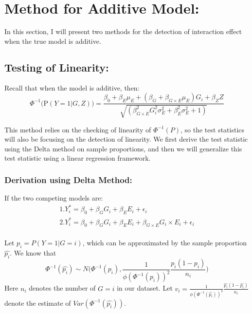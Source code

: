 \documentclass[
]{article}
\begin{document}
\hypertarget{method-for-additive-model}{%
\section{Method for Additive Model:}\label{method-for-additive-model}}

In this section, I will present two methods for the detection of
interaction effect when the true model is additive.

\hypertarget{testing-of-linearity}{%
\subsection{Testing of Linearity:}\label{testing-of-linearity}}

Recall that when the model is additive, then:
\[\Phi^{-1} \bigg(\text{P}(Y = 1 | G, Z) \bigg) = \frac{\beta_0+\beta_E \mu_E+(\beta_G + \beta_{G\times E} \mu_E)G_i + \beta_Z Z}{\sqrt{(\beta_{G\times E}^2 G_i^2 \sigma_E^2 + \beta_E^2 \sigma_E^2 + 1)}} \]

This method relies on the checking of linearity of \(\Phi^{-1}(P)\), so
the test statistics will also be focusing on the detection of linearity.
We first derive the test statistic using the Delta method on sample
proportions, and then we will generalize this test statistic using a
linear regression framework.

\hypertarget{derivation-using-delta-method}{%
\subsubsection{Derivation using Delta
Method:}\label{derivation-using-delta-method}}

If the two competing models are: \begin{equation}
\begin{aligned}
1. Y_i ^{*} = \beta_0 + \beta_G G_i + \beta_E E_i + \epsilon_i \\
2. Y_i ^{*} = \beta_0 + \beta_G G_i + \beta_E E_i + \beta_{G\times E}G_i \times E_i + \epsilon_i \\
\end{aligned}
\end{equation}

Let \(p_i = P(Y = 1|G=i)\), which can be approximated by the sample
proportion \(\hat{p_i}\). We know that
\[\Phi^{-1}(\hat{p_i}) \sim N\bigg(\Phi^{-1}(p_i), \frac{1}{\phi(\Phi^{-1}(p_i))^2} \frac{p_i(1-p_i)}{n_i}\bigg)\]
Here \(n_i\) denotes the number of \(G = i\) in our dataset. Let
\(v_i = \frac{1}{\phi(\Phi^{-1}(\hat{p_i}))^2} \frac{\hat{p_i}(1-\hat{p_i})}{n_i}\)
denote the estimate of \(Var(\Phi^{-1}(\hat{p_i}))\).
\end{document}
